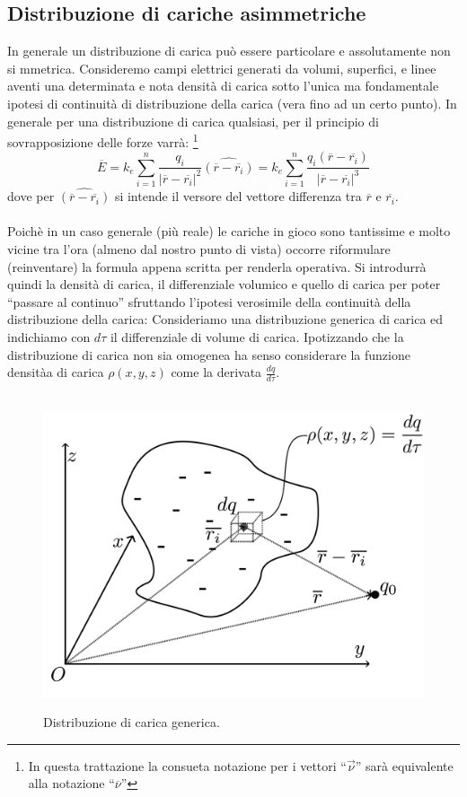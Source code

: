 \documentclass[11pt]{article}
\begin{document}
\subsection{Distribuzione di cariche asimmetriche}
In generale un distribuzione di carica può essere particolare e assolutamente non si mmetrica. Consideremo campi elettrici generati da volumi, superfici, e linee aventi una determinata e nota densità di carica sotto l'unica ma fondamentale ipotesi di continuità di distribuzione della carica (vera fino ad un certo punto).
In generale per una distribuzione di carica qualsiasi, per il principio di sovrapposizione delle forze varrà:
\footnote{In questa trattazione la consueta notazione per i vettori ``$\overrightarrow{\nu}$'' sarà equivalente alla notazione ``$\overline{\nu}$''}$$\overline{E}=k_e\sum_{i=1}^{n}\frac{q_i}{|\overline{r}-\overline{r_i}|^2}\widehat{(\overline{r}-\overline{r_i})}=k_e\sum_{i=1}^{n}\frac{q_i(\overline{r}-\overline{r_i})}{|\overline{r}-\overline{r_i}|^3}$$
dove per $\widehat{(\overline{r}-\overline{r_i})}$ si intende il versore del vettore differenza tra $\overline{r}$ e $\overline{r_i}$.
\\\\Poichè in un caso generale (più reale) le cariche in gioco sono tantissime e molto vicine tra l'ora (almeno dal nostro punto di vista) occorre riformulare (reinventare) la formula appena scritta per renderla operativa.
Si introdurrà quindi la densità di carica, il differenziale volumico e quello di carica per poter ``passare al continuo'' sfruttando l'ipotesi verosimile della continuità della distribuzione della carica:
\newpage
Consideriamo una distribuzione generica di carica ed indichiamo con $d\tau$ il differenziale di volume di carica. Ipotizzando che la distribuzione di carica non sia omogenea ha senso considerare la funzione densitàa di carica $\rho(x,y,z)$ come la derivata $\frac{dq}{d\tau}$.
 \begin{center}
\begin{figure}[H]
			  \vspace{-10pt}
              \hspace{-90pt}
              ~~~~~~~~~~~~~~~~~~~~~~~~~~~~~~~~ \includegraphics[scale=0.22]{distribuzione}
               \caption{\small{Distribuzione di carica generica.}}
               \end{figure} 
               \end{center}
\end{document}
